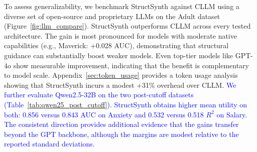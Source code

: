 To assess generalizability, we benchmark \textsf{StructSynth} against CLLM using a diverse set of open-source and proprietary LLMs on the Adult dataset (Figure~\ref{fig:llm_compare}). \textsf{StructSynth} outperforms CLLM across every tested architecture. The gain is most pronounced for models with moderate native capabilities (e.g., Maverick: +0.028 AUC), demonstrating that structural guidance can substantially boost weaker models. Even top-tier models like GPT-4o show measurable improvement, indicating that the benefit is complementary to model scale. Appendix~\ref{sec:token_usage} provides a token usage analysis showing that \textsf{StructSynth} incurs a modest +31\% overhead over CLLM.
\textcolor{blue}{We further evaluate Qwen2.5-32B on the two post-cutoff datasets (Table~\ref{tab:qwen25_post_cutoff}). \textsf{StructSynth} obtains higher mean utility on both: 0.856 versus 0.843 AUC on Anxiety and 0.532 versus 0.518 $R^2$ on Salary. The consistent direction provides additional evidence that the gains transfer beyond the GPT backbone, although the margins are modest relative to the reported standard deviations.}

